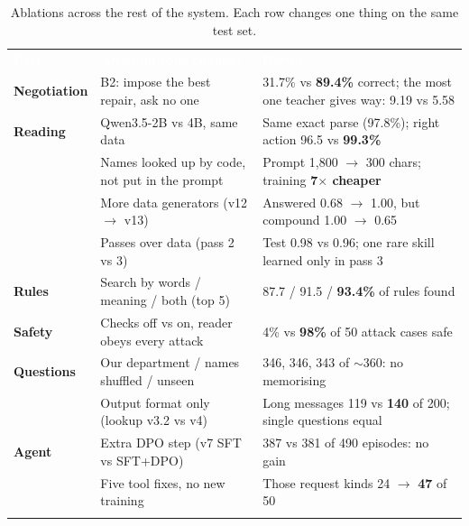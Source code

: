 \documentclass[10pt,a4paper]{article}
\renewcommand{\arraystretch}{1.2}
\newcommand{\hdr}{\rowcolor{secblue}}
\newcommand{\hd}[1]{\textcolor{white}{\textbf{#1}}}
\begin{document}
\begin{table}[H]
\centering\footnotesize
\renewcommand{\arraystretch}{1.42}
\setlength{\tabcolsep}{5pt}
\begin{tabularx}{\textwidth}{l p{5.6cm} X}
\arrayrulecolor{secblue}\toprule\arrayrulecolor{black}
\hdr \hd{Part} & \hd{Ablation (one change)} & \hd{Result}\\
\arrayrulecolor{secblue}\midrule\arrayrulecolor{black}
\textbf{\textcolor{secblue}{Negotiation}} & B2: impose the best repair, ask no one & 31.7\% vs \textbf{89.4\%} correct; the most one teacher gives way: 9.19 vs 5.58\\
\arrayrulecolor{black!15}\midrule\arrayrulecolor{black}
\textbf{\textcolor{secblue}{Reading}} & Qwen3.5-2B vs 4B, same data & Same exact parse (97.8\%); right action 96.5 vs \textbf{99.3\%}\\
 & Names looked up by code, not put in the prompt & Prompt 1{,}800 $\to$ 300 chars; training \textbf{7$\times$ cheaper}\\
 & More data generators (v12 $\to$ v13) & Answered 0.68 $\to$ 1.00, but compound 1.00 $\to$ 0.65\\
 & Passes over data (pass 2 vs 3) & Test 0.98 vs 0.96; one rare skill learned only in pass 3\\
\arrayrulecolor{black!15}\midrule\arrayrulecolor{black}
\textbf{\textcolor{secblue}{Rules}} & Search by words / meaning / both (top 5) & 87.7 / 91.5 / \textbf{93.4\%} of rules found\\
\arrayrulecolor{black!15}\midrule\arrayrulecolor{black}
\textbf{\textcolor{secblue}{Safety}} & Checks off vs on, reader obeys every attack & 4\% vs \textbf{98\%} of 50 attack cases safe\\
\arrayrulecolor{black!15}\midrule\arrayrulecolor{black}
\textbf{\textcolor{secblue}{Questions}} & Our department / names shuffled / unseen & 346, 346, 343 of $\sim$360: no memorising\\
 & Output format only (lookup v3.2 vs v4) & Long messages 119 vs \textbf{140} of 200; single questions equal\\
\arrayrulecolor{black!15}\midrule\arrayrulecolor{black}
\textbf{\textcolor{secblue}{Agent}} & Extra DPO step (v7 SFT vs SFT+DPO) & 387 vs 381 of 490 episodes: no gain\\
 & Five tool fixes, no new training & Those request kinds 24 $\to$ \textbf{47} of 50\\
\arrayrulecolor{secblue}\bottomrule\arrayrulecolor{black}
\end{tabularx}
\caption{Ablations across the rest of the system. Each row changes one thing on the same test set.}
\label{tab:ablall}
\end{table}
\end{document}
